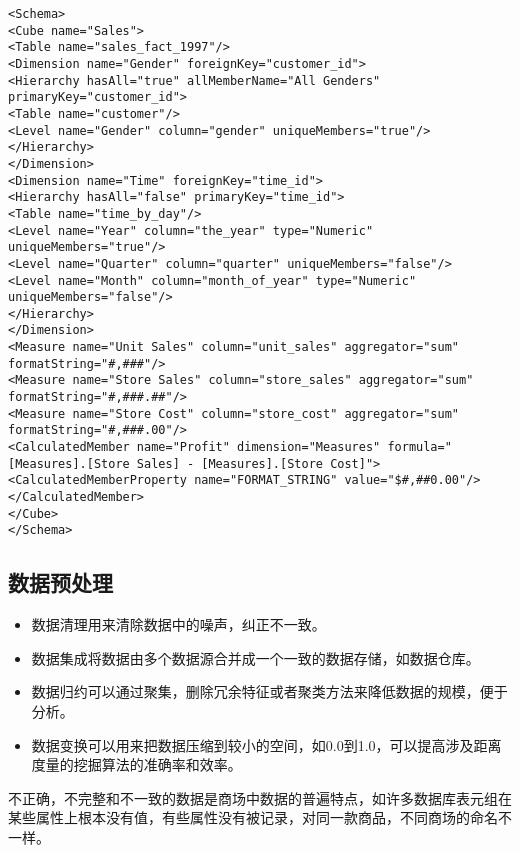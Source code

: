\begin{verbatim}
<Schema>
<Cube name="Sales">
<Table name="sales_fact_1997"/>
<Dimension name="Gender" foreignKey="customer_id">
<Hierarchy hasAll="true" allMemberName="All Genders" primaryKey="customer_id">
<Table name="customer"/>
<Level name="Gender" column="gender" uniqueMembers="true"/>
</Hierarchy>
</Dimension>
<Dimension name="Time" foreignKey="time_id">
<Hierarchy hasAll="false" primaryKey="time_id">
<Table name="time_by_day"/>
<Level name="Year" column="the_year" type="Numeric" uniqueMembers="true"/>
<Level name="Quarter" column="quarter" uniqueMembers="false"/>
<Level name="Month" column="month_of_year" type="Numeric" uniqueMembers="false"/>
</Hierarchy>
</Dimension>
<Measure name="Unit Sales" column="unit_sales" aggregator="sum" formatString="#,###"/>
<Measure name="Store Sales" column="store_sales" aggregator="sum" formatString="#,###.##"/>
<Measure name="Store Cost" column="store_cost" aggregator="sum" formatString="#,###.00"/>
<CalculatedMember name="Profit" dimension="Measures" formula="[Measures].[Store Sales] - [Measures].[Store Cost]">
<CalculatedMemberProperty name="FORMAT_STRING" value="$#,##0.00"/>
</CalculatedMember>
</Cube>
</Schema>
\end{verbatim}
\subsection{数据预处理}
\begin{itemize}
\item 数据清理用来清除数据中的噪声，纠正不一致。
\item 数据集成将数据由多个数据源合并成一个一致的数据存储，如数据仓库。
\item 数据归约可以通过聚集，删除冗余特征或者聚类方法来降低数据的规模，便于分析。
\item 数据变换可以用来把数据压缩到较小的空间，如0.0到1.0，可以提高涉及距离度量的挖掘算法的准确率和效率。
\end{itemize}
\par 不正确，不完整和不一致的数据是商场中数据的普遍特点，如许多数据库表元组在某些属性上根本没有值，有些属性没有被记录，对同一款商品，不同商场的命名不一样。
